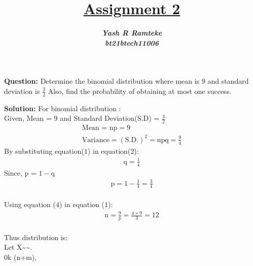 \documentclass[journal,12pt,twocolumn]{IEEEtran}
\title{\textbf{\underline{Assignment 2}}}
\author{\textbf{\textit{Yash R Ramteke}}\\
\textbf{\textit{bt21btech11006}}}
\begin{document}
\maketitle

\textbf{Question:}
Determine the binomial distribution where mean is $9$ and standard deviation is $\frac{3}{2}$ Also, find the probability of obtaining at most one success.

\bigskip
\textbf{Solution:}
For binomial distribution :\\
Given, Mean = $9$ and Standard Deviation(S.D) = $\frac{3}{2}$
\begin{align}
    \text{Mean = np} = 9
    \\
    \text{Variance} = (\text{S.D.})^{2} = \text{npq} = \frac{9}{4}
\end{align}
By substituting equation($1$) in equation($2$):
\begin{align}
      \text{q} = \frac{1}{4}
\end{align}
Since, p = $1 -$q
\begin{align}
      \text{p} = 1 - \frac{1}{4} = \frac{3}{4} 
\end{align}\\
Using equation ($4$) in equation ($1$):
\begin{align}
      \text{n} = \frac{9}{p} = \frac{4\times9}{3} = 12
\end{align}\\
Thus distribution is:\\
Let X\sim {}\sim {}.\\ 
 0\leq k \leq (n+m),
\end{document}
